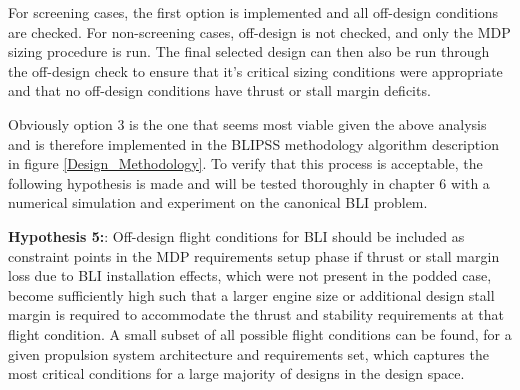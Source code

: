 			For screening cases, the first option is implemented and all off-design conditions are checked.  For non-screening cases, off-design is not checked, and only the MDP sizing procedure is run.  The final selected design can then also be run through the off-design check to ensure that it's critical sizing conditions were appropriate and that no off-design conditions have thrust or stall margin deficits. 
			
			Obviously option 3 is the one that seems most viable given the above analysis and is therefore implemented in the BLIPSS methodology algorithm description in figure \ref{Design_Methodology}.  To verify that this process is acceptable, the following hypothesis is made and will be tested thoroughly in chapter 6 with a numerical simulation and experiment on the canonical BLI problem. 
			
			\noindent\makebox[\linewidth]{\rule{\textwidth}{3pt}}				
			\textbf{Hypothesis 5:}:  Off-design flight conditions for BLI should be included as constraint points in the MDP requirements setup phase if thrust or stall margin loss due to BLI installation effects, which were not present in the podded case, become sufficiently high such that a larger engine size or additional design stall margin is required to accommodate the thrust and stability requirements at that flight condition.  A small subset of all possible flight conditions can be found, for a given propulsion system architecture and requirements set, which captures the most critical conditions for a large majority of designs in the design space. \\
			\noindent\makebox[\linewidth]{\rule{\textwidth}{3pt}}				
